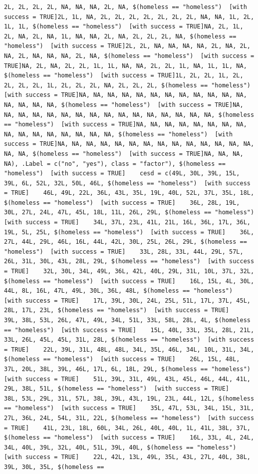 \documentclass{tufte-book}\usepackage[]{graphicx}\usepackage[]{xcolor}
\makeatletter
\newenvironment{kframe}{%
 \def\at@end@of@kframe{}%
 \ifinner\ifhmode%
  \def\at@end@of@kframe{\end{minipage}}%
  \begin{minipage}{\columnwidth}%
 \fi\fi%
 \def\FrameCommand##1{\hskip\@totalleftmargin \hskip-\fboxsep
 \colorbox{shadecolor}{##1}\hskip-\fboxsep
     \hskip-\linewidth \hskip-\@totalleftmargin \hskip\columnwidth}%
 \MakeFramed {\advance\hsize-\width
   \@totalleftmargin\z@ \linewidth\hsize
   \@setminipage}}%
 {\par\unskip\endMakeFramed%
 \at@end@of@kframe}
\newenvironment{knitrout}{}{} %
\makeatother
\begin{document}
\begin{knitrout}
\begin{kframe}
\begin{verbatim}
2L, 2L, 2L, 2L, NA, NA, NA, 2L, NA, $(homeless == "homeless")  [with success = TRUE]2L, 1L, NA, 2L, 2L, 2L, 2L, 2L, 2L, 2L, NA, NA, 1L, 2L, 1L, 1L, $(homeless == "homeless")  [with success = TRUE]NA, 2L, 1L, 2L, NA, 2L, NA, 1L, NA, NA, 2L, NA, 2L, 2L, 2L, NA, $(homeless == "homeless")  [with success = TRUE]2L, 2L, NA, NA, NA, NA, 2L, NA, 2L, NA, 2L, NA, NA, NA, 2L, NA, $(homeless == "homeless")  [with success = TRUE]NA, 2L, NA, 2L, 2L, 1L, 1L, NA, NA, 2L, 2L, 1L, NA, 1L, 1L, NA, $(homeless == "homeless")  [with success = TRUE]1L, 2L, 2L, 1L, 2L, 2L, 2L, 2L, 1L, 2L, 2L, 2L, NA, 2L, 2L, 2L, $(homeless == "homeless")  [with success = TRUE]NA, NA, NA, NA, NA, NA, NA, NA, NA, NA, NA, NA, NA, NA, NA, NA, $(homeless == "homeless")  [with success = TRUE]NA, NA, NA, NA, NA, NA, NA, NA, NA, NA, NA, NA, NA, NA, NA, NA, $(homeless == "homeless")  [with success = TRUE]NA, NA, NA, NA, NA, NA, NA, NA, NA, NA, NA, NA, NA, NA, NA, NA, $(homeless == "homeless")  [with success = TRUE]NA, NA, NA, NA, NA, NA, NA, NA, NA, NA, NA, NA, NA, NA, NA, NA, $(homeless == "homeless")  [with success = TRUE]NA, NA, NA, NA), .Label = c("no", "yes"), class = "factor"), $(homeless == "homeless")  [with success = TRUE]    cesd = c(49L, 30L, 39L, 15L, 39L, 6L, 52L, 32L, 50L, 46L, $(homeless == "homeless")  [with success = TRUE]    46L, 49L, 22L, 36L, 43L, 35L, 19L, 40L, 52L, 37L, 35L, 18L, $(homeless == "homeless")  [with success = TRUE]    36L, 28L, 19L, 30L, 27L, 24L, 47L, 45L, 18L, 11L, 26L, 29L, $(homeless == "homeless")  [with success = TRUE]    34L, 37L, 23L, 41L, 21L, 16L, 36L, 17L, 36L, 19L, 5L, 25L, $(homeless == "homeless")  [with success = TRUE]    36L, 27L, 44L, 29L, 46L, 16L, 44L, 42L, 30L, 25L, 26L, 29L, $(homeless == "homeless")  [with success = TRUE]    33L, 28L, 33L, 44L, 29L, 57L, 26L, 31L, 30L, 43L, 28L, 29L, $(homeless == "homeless")  [with success = TRUE]    32L, 30L, 34L, 49L, 36L, 42L, 40L, 29L, 31L, 10L, 37L, 32L, $(homeless == "homeless")  [with success = TRUE]    16L, 15L, 4L, 30L, 44L, 8L, 16L, 47L, 49L, 30L, 36L, 48L, $(homeless == "homeless")  [with success = TRUE]    17L, 39L, 30L, 24L, 25L, 51L, 17L, 37L, 45L, 28L, 17L, 23L, $(homeless == "homeless")  [with success = TRUE]    39L, 38L, 53L, 26L, 47L, 49L, 34L, 51L, 33L, 58L, 28L, 4L, $(homeless == "homeless")  [with success = TRUE]    15L, 40L, 33L, 35L, 28L, 21L, 33L, 26L, 45L, 45L, 31L, 28L, $(homeless == "homeless")  [with success = TRUE]    22L, 39L, 31L, 48L, 48L, 34L, 35L, 46L, 34L, 10L, 31L, 34L, $(homeless == "homeless")  [with success = TRUE]    26L, 15L, 48L, 37L, 20L, 38L, 39L, 46L, 17L, 6L, 18L, 29L, $(homeless == "homeless")  [with success = TRUE]    51L, 39L, 31L, 49L, 43L, 45L, 46L, 44L, 41L, 29L, 38L, 51L, $(homeless == "homeless")  [with success = TRUE]    38L, 53L, 29L, 31L, 57L, 38L, 39L, 43L, 19L, 23L, 44L, 12L, $(homeless == "homeless")  [with success = TRUE]    35L, 47L, 53L, 34L, 15L, 31L, 27L, 36L, 24L, 54L, 31L, 22L, $(homeless == "homeless")  [with success = TRUE]    41L, 23L, 18L, 60L, 34L, 26L, 40L, 40L, 1L, 41L, 38L, 37L, $(homeless == "homeless")  [with success = TRUE]    16L, 33L, 4L, 24L, 34L, 40L, 39L, 32L, 40L, 51L, 39L, 40L, $(homeless == "homeless")  [with success = TRUE]    22L, 42L, 13L, 49L, 35L, 43L, 27L, 40L, 38L, 39L, 30L, 35L, $(homeless == 
\end{verbatim}
\end{kframe}
\end{knitrout}
\end{document}
